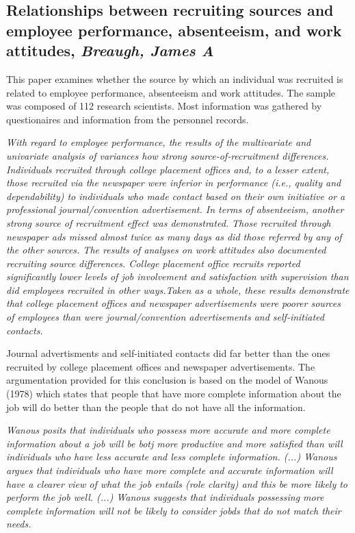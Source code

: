 \documentclass[a4paper, 11pt]{article} %
\begin{document}
\subsection*{Relationships between recruiting sources and employee performance, absenteeism, and work attitudes, \emph{Breaugh, James A} \cite{eight}}

This paper examines whether the source by which an individual was recruited is related to employee performance, absenteeism and work attitudes. The sample was composed of 112 research scientists. Most information was gathered by questionaires and information from the personnel records.

\emph{With regard to employee performance, the results of the multivariate
and univariate analysis of variances how strong source-of-recruitment differences.
Individuals recruited through college placement offices and, to a
lesser extent, those recruited via the newspaper were inferior in performance
(i.e., quality and dependability) to individuals who made contact
based on their own initiative or a professional journal/convention advertisement.
In terms of absenteeism, another strong source of recruitment
effect was demonstrated. Those recruited through newspaper ads missed
almost twice as many days as did those referred by any of the other
sources. The results of analyses on work attitudes also documented recruiting
source differences. College placement office recruits reported significantly
lower levels of job involvement and satisfaction with supervision
than did employees recruited in other ways.Taken as a whole, these
results demonstrate that college placement offices and newspaper advertisements
were poorer sources of employees than were journal/convention
advertisements and self-initiated contacts.}

Journal advertisments and self-initiated contacts did far better than the ones recruited by college placement offices and newspaper advertisements. The argumentation provided for this conclusion is based on the model of Wanous (1978) which states that people that have more complete information about the job will do better than the people that do not have all the information.

\emph{Wanous posits that individuals who possess more accurate and
more complete information about a job will be botj more productive and more satisfied than will individuals who have less accurate and less complete information. (...) 
Wanous argues that individuals who have more complete and accurate information
will have a clearer view of what the job entails (role clarity) and this be more likely to perform the job well. (...) Wanous suggests that individuals possessing more complete information will not be likely to consider jobds that do not match their needs.}
\end{document}
